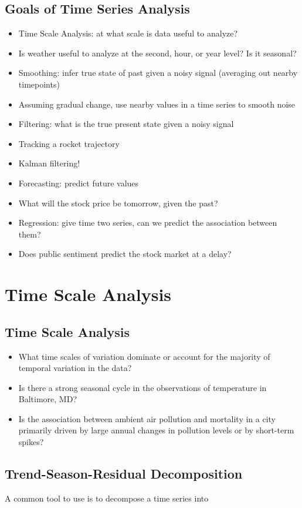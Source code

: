 \documentclass[11pt]{article}
\theoremstyle{definition}
\begin{document}
\subsection{Goals of Time Series Analysis}
\begin{itemize}
  \item Time Scale Analysis: at what scale is data useful to analyze?
  \item Is weather useful to analyze at the second, hour, or year level? Is it seasonal?
  \item Smoothing: infer true state of past given a noisy signal (averaging out nearby timepoints)
  \item Assuming gradual change, use nearby values in a time series to smooth noise
  \item Filtering: what is the true present state given a noisy signal
  \item Tracking a rocket trajectory
  \item Kalman filtering!
  \item Forecasting: predict future values
  \item What will the stock price be tomorrow, given the past?
  \item Regression: give time two series, can we predict the association between them?
  \item Does public sentiment predict the stock market at a delay?
\end{itemize}

\section{Time Scale Analysis}
\subsection{Time Scale Analysis}
\begin{itemize}
  \item What time scales of variation dominate or account for the
  majority of temporal variation in the data?
  \item Is there a strong seasonal cycle in the observations of
  temperature in Baltimore, MD?
  \item Is the association between ambient air pollution and mortality in
  a city primarily driven by large annual changes in pollution
  levels or by short-term spikes?
\end{itemize}

\subsection{Trend-Season-Residual Decomposition}
A common tool to use is to
decompose a time series into
\end{document}
